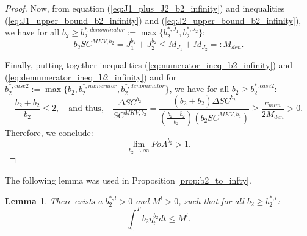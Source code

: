 \documentclass[11pt]{article}
\newtheorem{lemma}{Lemma}
\begin{document}
\begin{proof}
	Now, from equation (\ref{eq:J1_plus_J2_b2_infinity}) and inequalities (\ref{eq:J1_upper_bound_b2_infinity}) and (\ref{eq:J2_upper_bound_b2_infinity}), we have for all $b_2 \geq b_2^{*,denominator} := \max \{ b_2^{*,J_1}, b_2^{*,J_2} \}$:
	\begin{equation} 
		b_2 SC^{MKV, b_2}  = J^{b_2}_1 + J^{b_2}_2 \leq M_{J_1} + M_{J_2} =: M_{den}.
	\label{eq:demumerator_ineq_b2_infinity}
	\end{equation}
	
		
	Finally, putting together inequalities (\ref{eq:numerator_ineq_b2_infinity}) and (\ref{eq:demumerator_ineq_b2_infinity}) and for $b_2^{*,case 2} := \max \{ \bar{b}_2,  b_2^{*,numerator}, b_2^{*,denominator} \}$, we have for all $b_2 \geq b_2^{*,case 2}$:
	\begin{equation}
		\frac{b_2+\bar{b}_2}{b_2} \leq 2, \quad \text{and thus,} \quad \frac{\Delta SC^{b_2}}{SC^{MKV,b_2}} = \frac{(b_2 + \bar{b}_2) \Delta SC^{b_2} }{\left(\frac{b_2 + \bar{b}_2}{b_2} \right) (b_2 SC^{MKV,b_2} ) } \geq \frac{c_{num}}{ 2 M_{den}} > 0.
	\end{equation}
	Therefore, we conclude: 
	$$ \lim_{b_2 \to \infty} PoA^{b_2} > 1.$$ 
\end{proof}


The following lemma was used in Proposition \ref{prop:b2_to_infty}.
\begin{lemma}
	There exists a $b_2^{*,l}>0$ and $M^l>0$, such that for all $b_2 \geq b_2^{*,l}$:
	$$\int_0^T b_2 \eta^{b_2}_t dt \leq M^l.$$
	\label{lemma:int_b2_eta_t}
\end{lemma}
\end{document}
